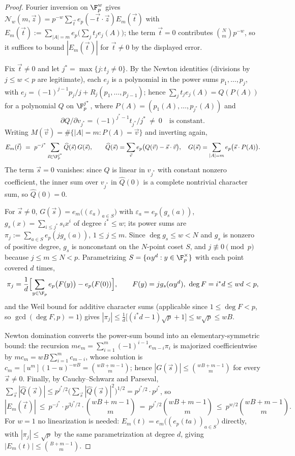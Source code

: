 \begin{proof}
Fourier inversion on $\F_p^w$ gives $\mathcal N_w(m,\vec z)=p^{-w}\sum_{\vec t}e_p(-\vec t\cdot\vec z)E_m(\vec t)$ with
$E_m(\vec t):=\sum_{|A|=m}e_p\bigl(\sum_jt_je_j(A)\bigr)$; the term $\vec t=0$ contributes $\binom Nm p^{-w}$, so it suffices to bound $|E_m(\vec t)|$ for $\vec t\ne0$ by the displayed error.

Fix $\vec t\ne0$ and let $j^*=\max\{j:t_j\ne0\}$.  By the Newton identities \textup(divisions by $j\le w<p$ are legitimate\textup), each $e_j$ is a polynomial in the power sums $p_1,\ldots,p_j$, with $e_j=(-1)^{j-1}p_j/j+R_j(p_1,\ldots,p_{j-1})$; hence $\sum_jt_je_j(A)=Q(P(A))$ for a polynomial $Q$ on $\F_p^{j^*}$, where $P(A)=(p_1(A),\ldots,p_{j^*}(A))$ and
\[
        \partial Q/\partial v_{j^*}=(-1)^{j^*-1}t_{j^*}/j^*\ \ne\ 0
        \quad\text{is constant.}
\]
Writing $M(\vec v)=\#\{|A|=m:P(A)=\vec v\}$ and inverting again,
\[
        E_m(\vec t)\ =\ p^{-j^*}\sum_{\vec s\in\F_p^{j^*}}\widehat Q(\vec s)\,G(\vec s),
        \qquad
        \widehat Q(\vec s)=\sum_{\vec v}e_p\bigl(Q(\vec v)-\vec s\cdot\vec v\bigr),
        \quad
        G(\vec s)=\sum_{|A|=m}e_p\bigl(\vec s\cdot P(A)\bigr).
\]
The term $\vec s=0$ vanishes: since $Q$ is linear in $v_{j^*}$ with constant nonzero coefficient, the inner sum over $v_{j^*}$ in $\widehat Q(0)$ is a complete nontrivial character sum, so $\widehat Q(0)=0$.

For $\vec s\ne0$, $G(\vec s)=e_m\bigl((\varepsilon_a)_{a\in S}\bigr)$ with $\varepsilon_a=e_p(g_s(a))$, $g_s(x)=\sum_{i\le j^*}s_ix^i$ of degree $i^*\le w$; its power sums are $\pi_j:=\sum_{a\in S}e_p(jg_s(a))$, $1\le j\le m$.  Since $\deg g_s\le w<N$ and $g_s$ is nonzero of positive degree, $g_s$ is nonconstant on the $N$-point coset $S$, and $j\not\equiv0\pmod p$ because $j\le m\le N<p$.  Parametrizing $S=\{\alpha y^d:y\in\F_p^\times\}$ with each point covered $d$ times,
\[
        \pi_j=\frac1d\Bigl[\sum_{y\in\F_p}e_p\bigl(F(y)\bigr)-e_p(F(0))\Bigr],
        \qquad F(y)=jg_s(\alpha y^d),\ \deg F=i^*d\le wd<p,
\]
and the Weil bound for additive character sums \textup(applicable since $1\le\deg F<p$, so $\gcd(\deg F,p)=1$\textup) gives $|\pi_j|\le\frac1d\bigl[(i^*d-1)\sqrt p+1\bigr]\le w\sqrt p\le wB$.

Newton domination converts the power-sum bound into an elementary-symmetric bound: the recursion $me_m=\sum_{i=1}^m(-1)^{i-1}e_{m-i}\pi_i$ is majorized coefficientwise by $mc_m=wB\sum_{i=1}^mc_{m-i}$, whose solution is $c_m=[u^m](1-u)^{-wB}=\binom{wB+m-1}m$; hence $|G(\vec s)|\le\binom{wB+m-1}m$ for every $\vec s\ne0$.  Finally, by Cauchy--Schwarz and Parseval, $\sum_{\vec s}|\widehat Q(\vec s)|\le p^{j^*/2}\bigl(\sum_{\vec s}|\widehat Q(\vec s)|^2\bigr)^{1/2}=p^{j^*/2}\cdot p^{j^*}$, so
\[
        |E_m(\vec t)|\ \le\ p^{-j^*}\cdot p^{3j^*/2}\cdot\binom{wB+m-1}m\ =\ p^{j^*/2}\binom{wB+m-1}m\ \le\ p^{w/2}\binom{wB+m-1}m .
\]
For $w=1$ no linearization is needed: $E_m(t)=e_m\bigl((e_p(ta))_{a\in S}\bigr)$ directly, with $|\pi_j|\le\sqrt p$ by the same parametrization at degree $d$, giving $|E_m(t)|\le\binom{B+m-1}m$.
\end{proof}

